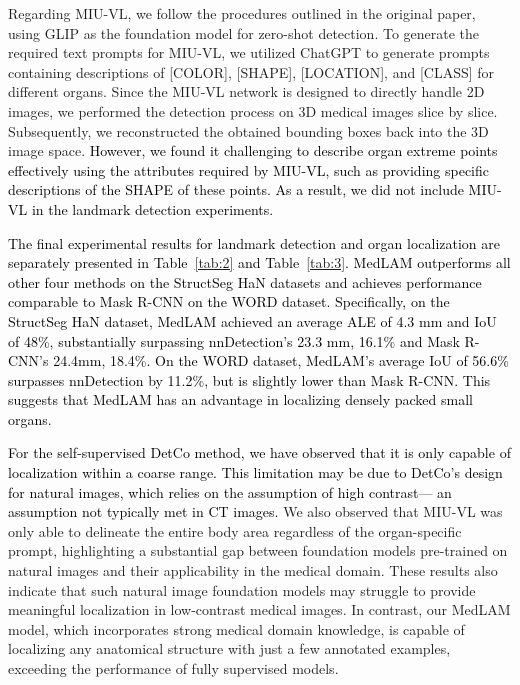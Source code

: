 \documentclass[times,twocolumn,final]{elsarticle}
\begin{document}
\par Regarding MIU-VL, we follow the procedures outlined in the original paper, using GLIP \citep{li2022grounded} as the foundation model for zero-shot detection.  To generate the required text prompts for MIU-VL, we utilized ChatGPT \citep{ouyang2022training} to generate prompts containing descriptions of [COLOR], [SHAPE], [LOCATION], and [CLASS] for different organs.  Since the MIU-VL network is designed to directly handle 2D images, we performed the detection process on 3D medical images slice by slice. Subsequently, we reconstructed the obtained bounding boxes back into the 3D image space. \textcolor{black}{However, we found it challenging to describe organ extreme points effectively using the attributes required by MIU-VL, such as providing specific descriptions of the SHAPE of these points. As a result, we did not include MIU-VL in the landmark detection experiments.}

\par \textcolor{black}{The final experimental results for landmark detection and organ localization are separately presented in Table~\ref{tab:2} and Table~\ref{tab:3}. MedLAM outperforms all other four methods on the StructSeg HaN datasets and achieves performance comparable to Mask R-CNN on the WORD dataset. Specifically, on the StructSeg HaN dataset, MedLAM achieved an average ALE of 4.3 mm and IoU of 48\%, substantially surpassing nnDetection's 23.3 mm, 16.1\% and Mask R-CNN's 24.4mm, 18.4\%. On the WORD dataset, MedLAM's average IoU of 56.6\% surpasses nnDetection by 11.2\%, but is slightly lower than Mask R-CNN. This suggests that MedLAM has an advantage in localizing densely packed small organs.} 

\textcolor{black}{For the self-supervised DetCo method, we have observed that it is only capable of localization within a coarse range. This limitation may be due to DetCo's design for natural images, which relies on the assumption of high contrast— an assumption not typically met in CT images.} We also observed that MIU-VL was only able to delineate the entire body area regardless of the organ-specific prompt, highlighting a substantial gap between foundation models pre-trained on natural images and their applicability in the medical domain. These results also indicate that such natural image foundation models may struggle to provide meaningful localization in low-contrast medical images. In contrast, our MedLAM model, which incorporates strong medical domain knowledge, is capable of localizing any anatomical structure with just a few annotated examples, exceeding the performance of fully supervised models.
\end{document}
